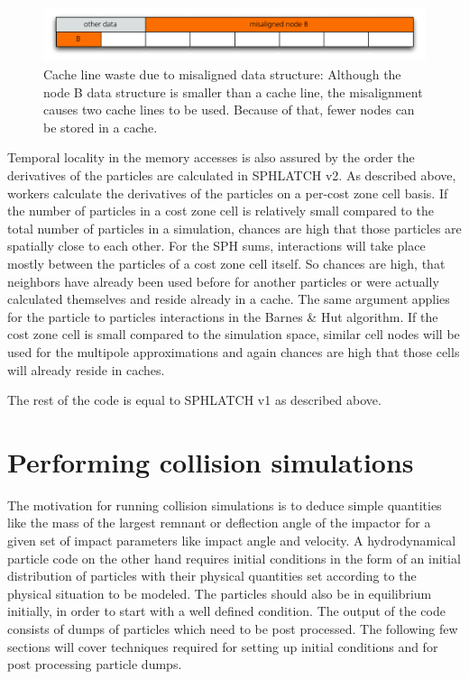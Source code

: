 \begin{figure}[htbp]
\begin{center}
\includegraphics[scale=0.6]{30algo_misalign.pdf}
\caption{Cache line waste due to misaligned data structure: Although the node B data structure is smaller than a cache line, the misalignment causes two cache lines to be used. Because of that, fewer nodes can be stored in a cache.}
\label{ch02_fig30}
\end{center}
\end{figure}

Temporal locality in the memory accesses is also assured by the order the derivatives of the particles are calculated in SPHLATCH v2. As described above, workers calculate the derivatives of the particles on a per-cost zone cell basis. If the number of particles in a cost zone cell is relatively small compared to the total number of particles in a simulation, chances are high that those particles are spatially close to each other. For the SPH sums, interactions will take place mostly between the particles of a cost zone cell itself. So chances are high, that neighbors have already been used before for another particles or were actually calculated themselves and reside already in a cache. The same argument applies for the particle to particles interactions in the Barnes \& Hut algorithm. If the cost zone cell is small compared to the simulation space, similar cell nodes will be used for the multipole approximations and again chances are high that those cells will already reside in caches.

The rest of the code is equal to SPHLATCH v1 as described above.


\section{Performing collision simulations}
\label{ch02_sec04}
The motivation for running collision simulations is to deduce simple quantities like the mass of the largest remnant or deflection angle of the impactor for a given set of impact parameters like impact angle and velocity. A hydrodynamical particle code on the other hand requires initial conditions in the form of an initial distribution of particles with their physical quantities set according to the physical situation to be modeled. The particles should also be in equilibrium initially, in order to start with a well defined condition.
The output of the code consists of dumps of particles which need to be post processed. The following few sections will cover techniques required for setting up initial conditions and for post processing particle dumps.

